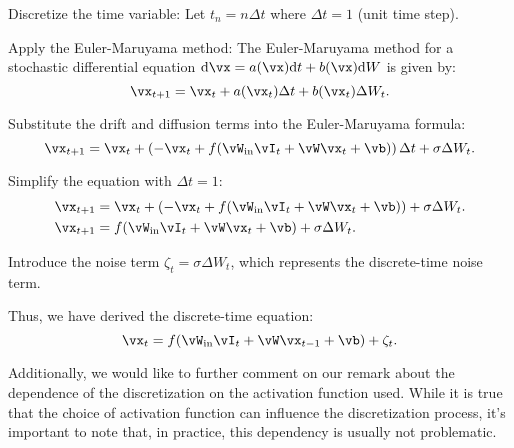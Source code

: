\documentclass[letterpaper]{article}
\newcounter{ct}
\newcommand{\dm}[1]{\ensuremath{\mathrm{d}{#1}}} %
\newcommand{\win}{\vW_{\text{in}}}
\begin{document}
Discretize the time variable: Let \( t_n = n \Delta t \) where \( \Delta t = 1 \) (unit time step).

Apply the Euler-Maruyama method: The Euler-Maruyama method for a stochastic differential equation \( \dm{\vx} = a(\vx)\dm{t} + b(\vx)\dm{W} \) is given by: \[ \vx_{t+1} = \vx_t + a(\vx_t) \Delta t + b(\vx_t) \Delta W_t. \]

Substitute the drift and diffusion terms into the Euler-Maruyama formula: \[ \vx_{t+1} = \vx_t + \left( -\vx_t + f(\win \vI_t + \vW \vx_t + \vb) \right) \Delta t + \sigma \Delta W_t. \]

Simplify the equation with \(\Delta t = 1\): 
\begin{align}
 \vx_{t+1} &= \vx_t + \left( -\vx_t + f(\win \vI_t + \vW \vx_t + \vb) \right) + \sigma \Delta W_t. \\
 \vx_{t+1} &= f(\win \vI_t + \vW \vx_t + \vb) + \sigma \Delta W_t. 
 \end{align}

Introduce the noise term \(\zeta_t = \sigma \Delta W_t\), which represents the discrete-time noise term.

Thus, we have derived the discrete-time equation: \[ \vx_t = f(\win \vI_t + \vW \vx_{t-1} + \vb) + \zeta_t. \]


 Additionally, we would like to further comment on our remark about the dependence of the discretization on the activation function used. 
 While it is true that the choice of activation function can influence the discretization process, it’s important to note that, in practice, this dependency is usually not problematic.
\end{document}
